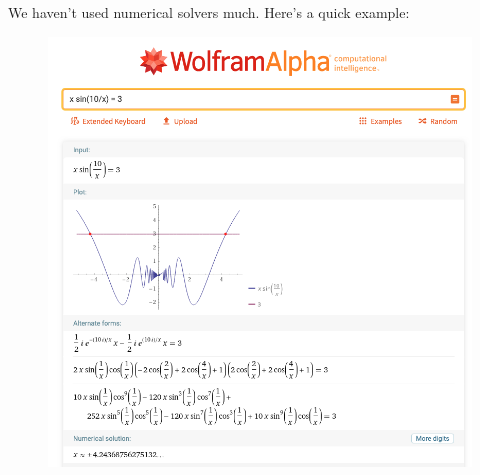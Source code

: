 \documentclass{article}
\begin{document}
\newpage

We haven't used numerical solvers much. Here's a quick example:

\begin{figure}[h]
\includegraphics[width=12cm]{wolfram-solver-example.png}
\centering
\end{figure}
\end{document}
